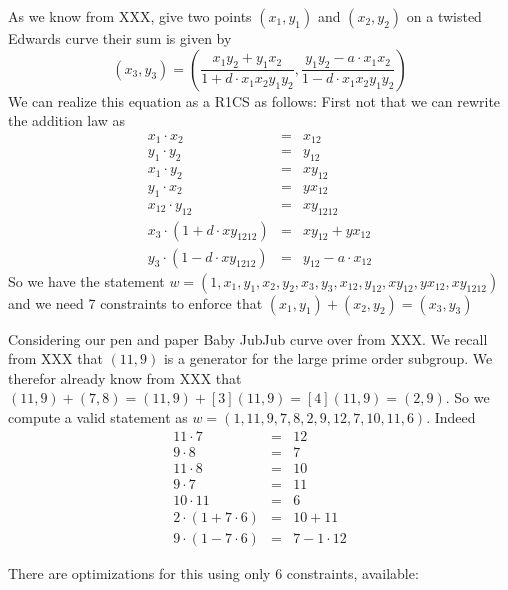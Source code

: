 As we know from XXX, give two points $(x_1,y_1)$ and $(x_2,y_2)$ on a twisted Edwards curve their sum is given by
$$
(x_3,y_3) = \left(\frac{x_1y_2+y_1x_2}{1+d\cdot x_1x_2y_1y_2}, \frac{y_1y_2-a\cdot x_1x_2}{1-d\cdot x_1x_2y_1y_2}\right)
$$
We can realize this equation as a R1CS as follows: First not that we can rewrite the addition law as
$$
\begin{array}{lcl}
x_1\cdot x_2 &=& x_{12}\\
y_1\cdot y_2 &=& y_{12}\\
x_1\cdot y_2 &=& xy_{12}\\
y_1\cdot x_2 &=& yx_{12}\\
x_{12}\cdot y_{12} &=& xy_{1212}\\
x_3\cdot (1+d\cdot xy_{1212}) &=& xy_{12}+yx_{12}\\
y_3\cdot (1-d\cdot xy_{1212}) &=& y_{12}-a\cdot x_{12}
\end{array}
$$
So we have the statement $w=(1,x_1,y_1,x_2,y_2,x_3,y_3,x_{12},y_{12},xy_{12},yx_{12},xy_{1212})$ and we need 7 constraints to enforce that $(x_1,y_1)+(x_2,y_2)=(x_3,y_3)$ 
\begin{example}
Considering our pen and paper Baby JubJub curve over from XXX. We recall from XXX that $(11,9)$ is a generator for the large prime order subgroup. We therefor already know from XXX that
$(11,9) + (7,8) = (11,9) + [3](11,9) = [4](11,9) = (2,9)$. So we compute a valid statement as 
$w=(1,11,9,7,8,2,9,12,7,10,11,6)$. Indeed
$$
\begin{array}{lcl}
11\cdot 7 &=& 12\\
9\cdot 8 &=& 7\\
11\cdot 8 &=& 10\\
9\cdot 7 &=& 11\\
10\cdot 11 &=& 6\\
2\cdot (1+7\cdot 6) &=& 10 + 11\\
9\cdot (1-7\cdot 6) &=& 7 -1\cdot 12
\end{array}
$$
\end{example}
There are optimizations for this using only 6 constraints, available:

